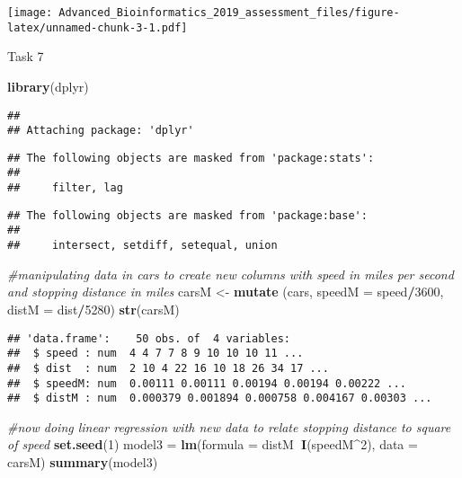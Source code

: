 \documentclass[]{article}
\newenvironment{Shaded}{\begin{snugshade}}{\end{snugshade}}
\newcommand{\KeywordTok}[1]{\textcolor[rgb]{0.13,0.29,0.53}{\textbf{#1}}}
\newcommand{\DataTypeTok}[1]{\textcolor[rgb]{0.13,0.29,0.53}{#1}}
\newcommand{\DecValTok}[1]{\textcolor[rgb]{0.00,0.00,0.81}{#1}}
\newcommand{\StringTok}[1]{\textcolor[rgb]{0.31,0.60,0.02}{#1}}
\newcommand{\CommentTok}[1]{\textcolor[rgb]{0.56,0.35,0.01}{\textit{#1}}}
\newcommand{\OperatorTok}[1]{\textcolor[rgb]{0.81,0.36,0.00}{\textbf{#1}}}
\newcommand{\NormalTok}[1]{#1}
\begin{document}
\texttt{[image: Advanced\_Bioinformatics\_2019\_assessment\_files/figure-latex/unnamed-chunk-3-1.pdf]}

Task 7

\begin{Shaded}
\begin{Highlighting}[]
\KeywordTok{library}\NormalTok{(dplyr)}
\end{Highlighting}
\end{Shaded}

\begin{verbatim}
## 
## Attaching package: 'dplyr'
\end{verbatim}

\begin{verbatim}
## The following objects are masked from 'package:stats':
## 
##     filter, lag
\end{verbatim}

\begin{verbatim}
## The following objects are masked from 'package:base':
## 
##     intersect, setdiff, setequal, union
\end{verbatim}

\begin{Shaded}
\begin{Highlighting}[]
\CommentTok{#manipulating data in cars to create new columns with speed in miles per second and stopping distance in miles}
\NormalTok{carsM <-}\StringTok{ }\KeywordTok{mutate}\NormalTok{ (cars, }\DataTypeTok{speedM =}\NormalTok{ speed}\OperatorTok{/}\DecValTok{3600}\NormalTok{, }\DataTypeTok{distM =}\NormalTok{ dist}\OperatorTok{/}\DecValTok{5280}\NormalTok{)}
\KeywordTok{str}\NormalTok{(carsM)}
\end{Highlighting}
\end{Shaded}

\begin{verbatim}
## 'data.frame':    50 obs. of  4 variables:
##  $ speed : num  4 4 7 7 8 9 10 10 10 11 ...
##  $ dist  : num  2 10 4 22 16 10 18 26 34 17 ...
##  $ speedM: num  0.00111 0.00111 0.00194 0.00194 0.00222 ...
##  $ distM : num  0.000379 0.001894 0.000758 0.004167 0.00303 ...
\end{verbatim}

\begin{Shaded}
\begin{Highlighting}[]
\CommentTok{#now doing linear regression with new data to relate stopping distance to square of speed}
\KeywordTok{set.seed}\NormalTok{(}\DecValTok{1}\NormalTok{)}
\NormalTok{model3 =}\StringTok{ }\KeywordTok{lm}\NormalTok{(}\DataTypeTok{formula =}\NormalTok{ distM}\OperatorTok{~}\KeywordTok{I}\NormalTok{(speedM}\OperatorTok{^}\DecValTok{2}\NormalTok{), }\DataTypeTok{data =}\NormalTok{ carsM)}
\KeywordTok{summary}\NormalTok{(model3)}
\end{Highlighting}
\end{Shaded}
\end{document}

